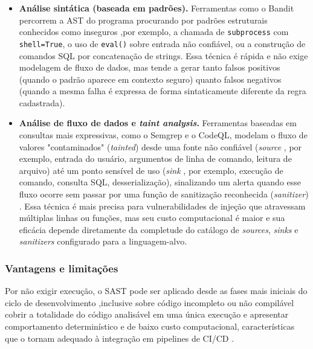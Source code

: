 \begin{itemize}
\item \textbf{Análise sintática (baseada em padrões).} Ferramentas como o Bandit percorrem a AST do programa procurando por padrões estruturais conhecidos como inseguros ,por exemplo, a chamada de \texttt{subprocess} com \texttt{shell=True}, o uso de \texttt{eval()} sobre entrada não confiável, ou a construção de comandos SQL por concatenação de strings. Essa técnica é rápida e não exige modelagem de fluxo de dados, mas tende a gerar tanto falsos positivos (quando o padrão aparece em contexto seguro) quanto falsos negativos (quando a mesma falha é expressa de forma sintaticamente diferente da regra cadastrada).
\item \textbf{Análise de fluxo de dados e \textit{taint analysis}.} Ferramentas baseadas em consultas mais expressivas, como o Semgrep e o CodeQL, modelam o fluxo de valores "contaminados" (\textit{tainted}) desde uma fonte não confiável (\textit{source} , por exemplo, entrada do usuário, argumentos de linha de comando, leitura de arquivo) até um ponto sensível de uso (\textit{sink} , por exemplo, execução de comando, consulta SQL, desserialização), sinalizando um alerta quando esse fluxo ocorre sem passar por uma função de sanitização reconhecida (\textit{sanitizer}) \cite{Li2024SASTCC, Dalaq2025SASTSLR}. Essa técnica é mais precisa para vulnerabilidades de injeção que atravessam múltiplas linhas ou funções, mas seu custo computacional é maior e sua eficácia depende diretamente da completude do catálogo de \textit{sources}, \textit{sinks} e \textit{sanitizers} configurado para a linguagem-alvo.
\end{itemize}

\subsubsection{Vantagens e limitações}\label{subsubsec:sast-vantagens-limitacoes}

Por não exigir execução, o SAST pode ser aplicado desde as fases mais iniciais do ciclo de desenvolvimento ,inclusive sobre código incompleto ou não compilável  cobrir a totalidade do código analisável em uma única execução e apresentar comportamento determinístico e de baixo custo computacional, características que o tornam adequado à integração em pipelines de CI/CD \cite{Dalaq2025SASTSLR, Tamberg2025LLMHarness}.

